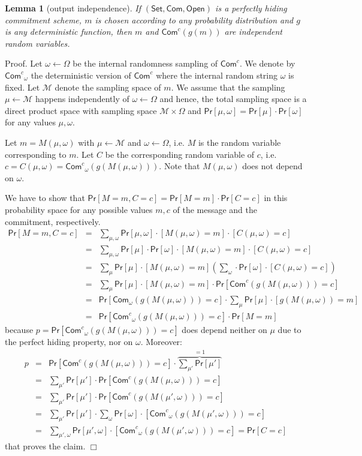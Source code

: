 \documentclass{article}
\newtheorem{lemma}{Lemma}[section]
\newenvironment{proof}{\textsf{Proof}.}{\hfill$\Box$}
\newcommand{\setup}[0]{\mathsf{Set}}
\newcommand{\commit}[0]{\mathsf{Com}}
\newcommand{\open}[0]{\mathsf{Open}}
\newcommand{\commitc}[0]{{\mathsf{Com}^{c}}}
\newcommand{\prob}[0]{\mathsf{Pr}} %
\begin{document}
\begin{lemma}[output independence]\label{le:outputindependence}
If $(\setup, \commit, \open)$ is a perfectly hiding commitment scheme, $m$ is chosen according to any probability distribution and $g$ is any deterministic function, then $m$ and $\commitc(g(m))$ are independent random variables.
\end{lemma}
\begin{proof}
Let $\omega \gets \Omega$ be the internal randomness sampling of $\commitc$. We denote by $\commitc_\omega$ the deterministic version of $\commitc$ where the internal random string $\omega$ is fixed. Let $\mathcal{M}$ denote the sampling space of $m$. We assume that the sampling $\mu\gets \mathcal{M}$ happens independently of $\omega \gets \Omega$ and hence, the total sampling space is a direct product space with sampling space $\mathcal{M}\times \Omega$ and $\prob[\mu,\omega]=\prob[\mu]\cdot \prob[\omega]$ for any values $\mu, \omega$.

Let $m=M(\mu,\omega)$ with $\mu\gets \mathcal{M}$ and $\omega\gets \Omega$, i.e. $M$ is the random variable corresponding to $m$. Let $C$ be the corresponding random variable of $c$, i.e. $c=C(\mu,\omega)=\commitc_\omega(g(M(\mu,\omega)))$. Note that $M(\mu,\omega)$ does not depend on $\omega$.

We have to show that $\prob[M=m,C=c] = \prob[M=m]\cdot \prob[C=c]$ in this probability space for any possible values $m,c$ of the message and the commitment, respectively.
\begin{eqnarray*}
\prob[M=m,C=c] &=& \sum_{\mu,\omega}\prob[\mu,\omega]\cdot [M(\mu,\omega)=m]\cdot [C(\mu,\omega)=c]\\
&=& \sum_{\mu,\omega}\prob[\mu]\cdot\prob[\omega]\cdot [M(\mu,\omega)=m]\cdot [C(\mu,\omega)=c]\\
&=& \sum_{\mu}\prob[\mu]\cdot[M(\mu,\omega)=m]\left(\sum_{\omega}\cdot\prob[\omega]\cdot [C(\mu,\omega)=c]\right)\\
&=& \sum_{\mu}\prob[\mu]\cdot[M(\mu,\omega)=m]\cdot
\prob[\commitc(g(M(\mu,\omega)))=c]\\
&=& \prob[\commit_\omega(g(M(\mu,\omega)))=c]\cdot \sum_{\mu}\prob[\mu]\cdot[g(M(\mu,\omega))=m]\\
&=& \prob[\commitc_\omega(g(M(\mu,\omega)))=c]\cdot \prob[M=m]
\end{eqnarray*}
because $p = \prob[\commitc_\omega(g(M(\mu,\omega)))=c]$ does depend neither on $\mu$ due to the perfect hiding property, nor on $\omega$. Moreover:
\begin{eqnarray*}
p &=& \prob[\commitc(g(M(\mu,\omega)))=c] \cdot \overbrace{\sum_{\mu'} \prob[\mu']}^{=1}\\
&=& \sum_{\mu'} \prob[\mu']\cdot \prob[\commitc(g(M(\mu,\omega)))=c]\\
&=& \sum_{\mu'} \prob[\mu']\cdot \prob[\commitc(g(M(\mu',\omega)))=c]\\
&=& \sum_{\mu'} \prob[\mu']\cdot \sum_{\omega}\prob[\omega]\cdot [\commitc_\omega(g(M(\mu',\omega)))=c]\\
&=& \sum_{\mu',\omega} \prob[\mu',\omega]\cdot [\commitc_\omega(g(M(\mu',\omega)))=c] = \prob[C=c]
\end{eqnarray*}
that proves the claim.
\end{proof}
\end{document}
